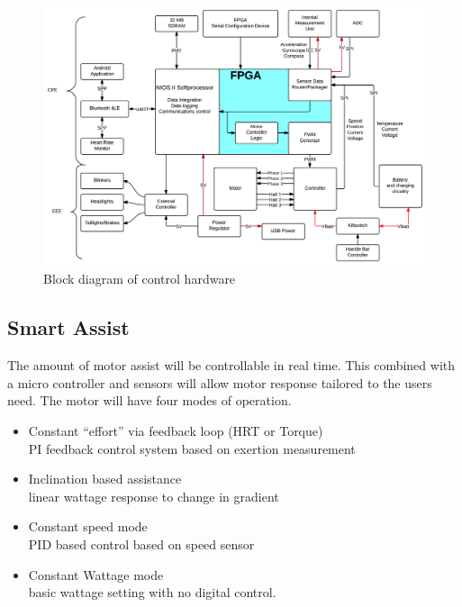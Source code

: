 \documentclass[12pt,article]{IEEEtran}
\begin{document}
    \begin{figure}[t]
        \includegraphics[width=\textwidth]{SystemDiagram}
        \caption{Block diagram of control hardware}
    \end{figure}
    \subsection{\bfseries Smart Assist}
        The amount of motor assist will be controllable in real time. This combined with a micro controller 
        and sensors will allow motor response tailored to the users need. The motor will have four modes of operation.
        \begin{itemize}
        \item Constant “effort” via feedback loop (HRT or Torque) \hfill \\
            PI feedback control system based on exertion measurement
    
        \item Inclination based assistance \hfill \\
           linear wattage response to change in gradient
    
        \item Constant speed mode \hfill \\
            PID based control based on speed sensor
    
        \item Constant Wattage mode \hfill \\
         basic wattage setting with no digital control.
        \end{itemize}
        
\end{document}
